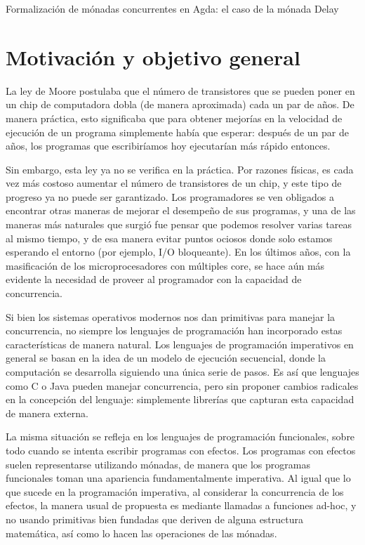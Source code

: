 \documentclass[11pt,a4paper]{article}
\begin{document}
Formalización de mónadas concurrentes en Agda: el caso de la mónada Delay

\section{Motivación y objetivo general}

La ley de Moore postulaba que el número de transistores que se pueden
poner en un chip de computadora dobla (de manera aproximada) cada un par
de años. De manera práctica, esto significaba que para obtener
mejorías en la velocidad de ejecución de un programa simplemente había
que esperar: después de un par de años, los programas que escribiríamos
hoy ejecutarían más rápido entonces.

Sin embargo, esta ley ya no se verifica en la práctica. Por razones
físicas, es cada vez más costoso aumentar el número de transistores de
un chip, y este tipo de progreso ya no puede ser garantizado. Los
programadores se ven obligados a encontrar otras maneras de mejorar el
desempeño de sus programas, y una de las maneras más naturales que
surgió fue pensar que podemos resolver varias tareas al mismo tiempo,
y de esa manera evitar puntos ociosos donde solo estamos esperando el
entorno (por ejemplo, I/O bloqueante). En los últimos años, con la
masificación de los microprocesadores con múltiples core, se hace aún
más evidente la necesidad de proveer al programador con la capacidad
de concurrencia.

Si bien los sistemas operativos modernos nos dan primitivas para
manejar la concurrencia, no siempre los lenguajes de programación han
incorporado estas características de manera natural. Los lenguajes de
programación imperativos en general se basan en la idea de un modelo
de ejecución secuencial, donde la computación se desarrolla siguiendo
una única serie de pasos. Es así que lenguajes como C o Java pueden
manejar concurrencia, pero sin proponer cambios radicales en la
concepción del lenguaje: simplemente librerías que capturan esta
capacidad de manera externa.

La misma situación se refleja en los lenguajes de programación
funcionales, sobre todo cuando se intenta escribir programas con
efectos. Los programas con efectos suelen representarse utilizando
mónadas, de manera que los programas funcionales toman una apariencia
fundamentalmente imperativa. Al igual que lo que sucede en la
programación imperativa, al considerar la concurrencia de los efectos, la
manera usual de propuesta es mediante llamadas a funciones ad-hoc, y
no usando primitivas bien fundadas que deriven de alguna estructura
matemática, así como lo hacen las operaciones de las mónadas.
\end{document}
